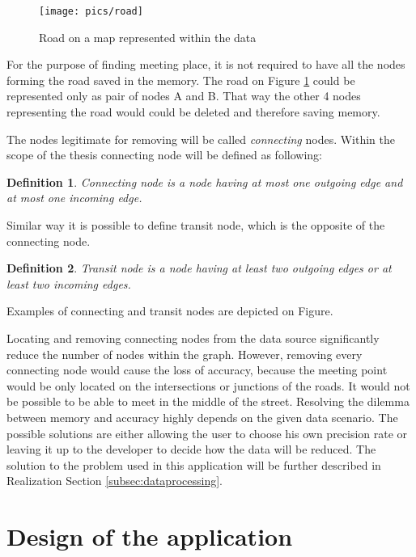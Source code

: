 \documentclass[thesis=M,english]{FITthesis}[2012/10/20]
\newtheorem{defin}{Definition}
\begin{document}
\begin{figure}[H]
\centering
\texttt{[image: pics/road]}
\caption{Road on a map represented within the data}
\label{pic:Road}
\end{figure}

For the purpose of finding meeting place, it is not required to have all the nodes forming the road saved in the memory. The road on Figure \ref{pic:Road} could be represented only as pair of nodes A and B. That way the other 4 nodes representing the road would could be deleted and therefore saving memory. 

The nodes legitimate for removing will be called \textit{connecting} nodes. Within the scope of the thesis connecting node will be defined as following:

\begin{defin}
\label{def:connect}
Connecting node is a node having at most one outgoing edge and at most one incoming edge. 
\end{defin}

Similar way it is possible to define transit node, which is the opposite of the connecting node. 

\begin{defin}
\label{def:transit}
Transit node is a node having at least two outgoing edges or at least two incoming edges. 
\end{defin}

Examples of connecting and transit nodes are depicted on Figure.



Locating and removing connecting nodes from the data source significantly reduce the number of nodes within the graph. However, removing every connecting node would cause the loss of accuracy, because the meeting point would be only located on the intersections or junctions of the roads. It would not be possible to be able to meet in the middle of the street. 
Resolving the dilemma between memory and accuracy highly depends on the given data scenario. The possible solutions are either allowing the user to choose his own precision rate or leaving it up to the developer to decide how the data will be reduced. The solution to the problem used in this application will be further described in Realization Section \ref{subsec:dataprocessing}.

\chapter{Design of the application}
\label{ch:DOTA}
\end{document}
